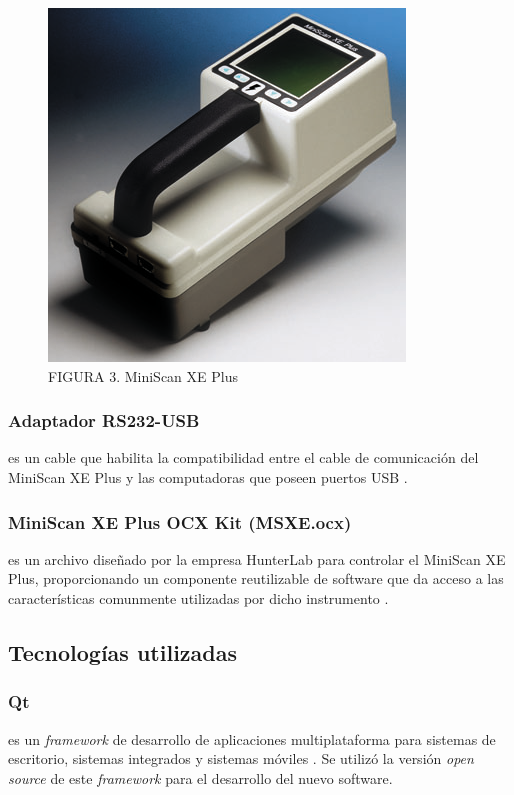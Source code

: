 \documentclass[conference]{IEEEtran}
\begin{document}
		\begin{figure}[H]
			\centering
			\label{figura_1}
			\includegraphics[scale=0.9]{img/MiniScanXEPlus}
			\caption{FIGURA 3. MiniScan XE Plus}
		\end{figure}
		
		\subsubsection{Adaptador RS232-USB}
			es un cable que habilita la compatibilidad entre el cable de comunicaci\'{o}n del MiniScan XE Plus y las computadoras que poseen puertos USB \cite{RS232}.
		
		\subsubsection{MiniScan XE Plus OCX Kit (MSXE.ocx)}
			es un archivo dise\~{n}ado por la empresa HunterLab para controlar el MiniScan XE Plus, proporcionando un componente reutilizable de software que da acceso a las caracter\'{i}sticas comunmente utilizadas por dicho instrumento \cite{MiniScanXEPlus-manual}.

	\subsection{Tecnolog\'{i}as utilizadas}
		\subsubsection{Qt}
			es un \textit{framework} de desarrollo de aplicaciones multiplataforma para sistemas de escritorio, sistemas integrados y sistemas m\'{o}viles \cite{Qt}. Se utiliz\'{o} la versi\'{o}n \textit{open source} de este \textit{framework} para el desarrollo del nuevo software.
			
\end{document}
